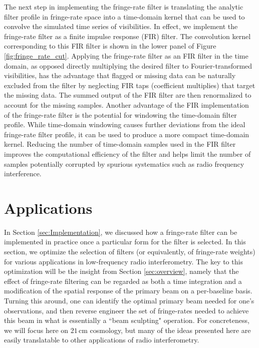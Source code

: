 \documentclass[twocolumn,apj,numberedappendix]{emulateapj}
\begin{document}
The next step in implementing the fringe-rate filter is translating the analytic filter profile in fringe-rate space into 
a time-domain kernel that can be used to convolve the simulated time series of visibilities.  In effect, we implement
the fringe-rate filter as a finite impulse response (FIR) filter.  The convolution kernel corresponding to this FIR
filter is shown in the lower panel of Figure \ref{fig:fringe_rate_cut}.  Applying the fringe-rate filter as an FIR filter in
the time domain, as opposed directly multiplying the desired filter to Fourier-transformed visibilities, has the advantage 
that flagged or missing data can be naturally excluded from the filter by neglecting
FIR taps (coefficient multiplies) that target the missing data. The summed output of the FIR filter are then renormalized to
account for the missing samples.  Another advantage of the FIR implementation of the fringe-rate filter is the potential for
windowing the time-domain filter profile.  While time-domain windowing causes further deviations from the ideal
fringe-rate filter profile, it can be used to produce a more compact time-domain kernel.
Reducing the number of time-domain samples used in the FIR filter improves the computational efficiency of the filter and
helps limit the number of samples potentially corrupted by spurious systematics such as radio frequency interference.


\section{Applications}
\label{sec:bmsculpt}

In Section \ref{sec:Implementation}, we discussed how a fringe-rate filter can be implemented in practice once a particular form for the filter is selected. In this section, we optimize the selection of filters (or equivalently, of fringe-rate weights) for various applications in low-frequency radio interferometry. The key to this optimization will be the insight from Section \ref{sec:overview}, namely that the effect of fringe-rate filtering can be regarded as both a time integration and a modification of the spatial response of the primary beam on a per-baseline basis. Turning this around, one can identify the optimal primary beam needed for one's observations, and then reverse engineer the set of fringe-rates needed to achieve this beam in what is essentially a ``beam sculpting" operation. For concreteness, we will focus here on $21\,\textrm{cm}$ cosmology, but many of the ideas presented here are easily translatable to other applications of radio interferometry.
\end{document}
